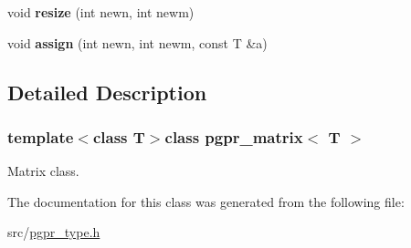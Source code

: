 \begin{DoxyCompactItemize}
\item 
\hypertarget{classpgpr__matrix_ac2746dd90e4586c31d8a13d1c66a057e}{void {\bfseries resize} (int newn, int newm)}\label{classpgpr__matrix_ac2746dd90e4586c31d8a13d1c66a057e}

\item 
\hypertarget{classpgpr__matrix_a54fa5240d2f0c1a8c034f7e15a8e756c}{void {\bfseries assign} (int newn, int newm, const T \&a)}\label{classpgpr__matrix_a54fa5240d2f0c1a8c034f7e15a8e756c}

\end{DoxyCompactItemize}


\subsection{Detailed Description}
\subsubsection*{template$<$class T$>$class pgpr\-\_\-matrix$<$ T $>$}

Matrix class. 

The documentation for this class was generated from the following file\-:\begin{DoxyCompactItemize}
\item 
src/\hyperlink{pgpr__type_8h}{pgpr\-\_\-type.\-h}\end{DoxyCompactItemize}
